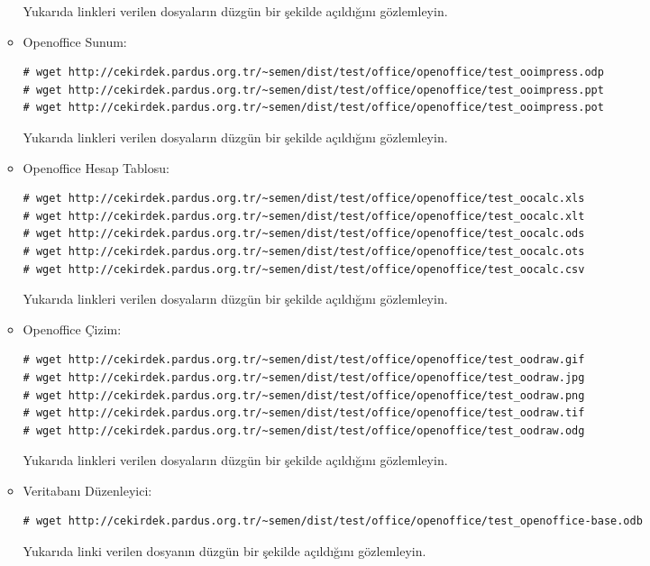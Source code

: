 \documentclass[a4paper,10pt]{article}
\begin{document}
\begin{enumerate}
\begin{itemize}
Yukarıda linkleri verilen dosyaların düzgün bir şekilde açıldığını gözlemleyin.

\item Openoffice Sunum:
\begin{verbatim}
# wget http://cekirdek.pardus.org.tr/~semen/dist/test/office/openoffice/test_ooimpress.odp
# wget http://cekirdek.pardus.org.tr/~semen/dist/test/office/openoffice/test_ooimpress.ppt
# wget http://cekirdek.pardus.org.tr/~semen/dist/test/office/openoffice/test_ooimpress.pot
\end{verbatim}

Yukarıda linkleri verilen dosyaların düzgün bir şekilde açıldığını gözlemleyin.

\item Openoffice Hesap Tablosu:
\begin{verbatim}
# wget http://cekirdek.pardus.org.tr/~semen/dist/test/office/openoffice/test_oocalc.xls
# wget http://cekirdek.pardus.org.tr/~semen/dist/test/office/openoffice/test_oocalc.xlt
# wget http://cekirdek.pardus.org.tr/~semen/dist/test/office/openoffice/test_oocalc.ods
# wget http://cekirdek.pardus.org.tr/~semen/dist/test/office/openoffice/test_oocalc.ots
# wget http://cekirdek.pardus.org.tr/~semen/dist/test/office/openoffice/test_oocalc.csv	
\end{verbatim}

Yukarıda linkleri verilen dosyaların düzgün bir şekilde açıldığını gözlemleyin.

\item Openoffice Çizim:
\begin{verbatim}
# wget http://cekirdek.pardus.org.tr/~semen/dist/test/office/openoffice/test_oodraw.gif
# wget http://cekirdek.pardus.org.tr/~semen/dist/test/office/openoffice/test_oodraw.jpg
# wget http://cekirdek.pardus.org.tr/~semen/dist/test/office/openoffice/test_oodraw.png
# wget http://cekirdek.pardus.org.tr/~semen/dist/test/office/openoffice/test_oodraw.tif
# wget http://cekirdek.pardus.org.tr/~semen/dist/test/office/openoffice/test_oodraw.odg
\end{verbatim}

Yukarıda linkleri verilen dosyaların düzgün bir şekilde açıldığını gözlemleyin.
\item Veritabanı Düzenleyici:
\begin{verbatim}
# wget http://cekirdek.pardus.org.tr/~semen/dist/test/office/openoffice/test_openoffice-base.odb
\end{verbatim}

Yukarıda linki verilen dosyanın düzgün bir şekilde açıldığını gözlemleyin.


\end{itemize}
\end{enumerate}
\end{document}
